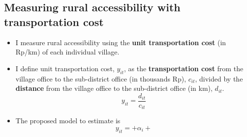 \documentclass[
11pt,notheorems,hyperref={pdfauthor=Maghfira Ramadhani}
]{beamer}
\newcommand{\al}[1]{\textbf{\alert{#1}}}
\begin{document}
\subsection{Measuring rural accessibility with transportation cost}
\begin{frame}
    \begin{itemize}
        \item I measure rural accessibility using the \al{unit transportation cost} (in Rp/km) of each individual village. 
        \item I define unit transportation cost, $y_{it}$, as the \textbf{transportation cost} from the village office to the sub-district office (in thousands Rp), $c_{it}$, divided by the \textbf{distance} from the village office to the sub-district office (in km), $d_{it}$.
        \begin{equation}
        y_{it}=\frac{d_{it}}{c_{it}}    \end{equation}
        
    \end{itemize} 
\end{frame}

\begin{frame}
    \begin{itemize}
        \item The proposed model to estimate is
        \begin{equation}
        y_{it}=+\alpha_i+
        \end{equation}
    \end{itemize}
\end{frame}
\end{document}
